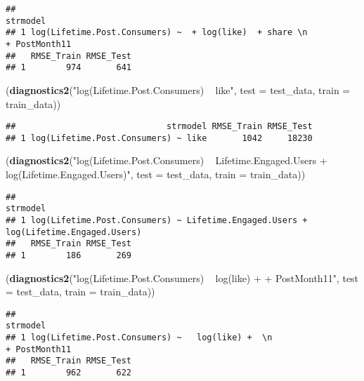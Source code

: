 \documentclass[
]{article}
\newenvironment{Shaded}{\begin{snugshade}}{\end{snugshade}}
\newcommand{\DataTypeTok}[1]{\textcolor[rgb]{0.13,0.29,0.53}{#1}}
\newcommand{\KeywordTok}[1]{\textcolor[rgb]{0.13,0.29,0.53}{\textbf{#1}}}
\newcommand{\NormalTok}[1]{#1}
\newcommand{\StringTok}[1]{\textcolor[rgb]{0.31,0.60,0.02}{#1}}
\begin{document}
\begin{verbatim}
##                                                                                strmodel
## 1 log(Lifetime.Post.Consumers) ~  + log(like)  + share \n                 + PostMonth11
##   RMSE_Train RMSE_Test
## 1        974       641
\end{verbatim}

\begin{Shaded}
\begin{Highlighting}[]
\NormalTok{(}\KeywordTok{diagnostics2}\NormalTok{(}\StringTok{"log(Lifetime.Post.Consumers) ~ like"}\NormalTok{, }\DataTypeTok{test =}\NormalTok{ test_data, }\DataTypeTok{train =}\NormalTok{ train_data))}
\end{Highlighting}
\end{Shaded}

\begin{verbatim}
##                              strmodel RMSE_Train RMSE_Test
## 1 log(Lifetime.Post.Consumers) ~ like       1042     18230
\end{verbatim}

\begin{Shaded}
\begin{Highlighting}[]
\NormalTok{(}\KeywordTok{diagnostics2}\NormalTok{(}\StringTok{"log(Lifetime.Post.Consumers) ~ Lifetime.Engaged.Users + log(Lifetime.Engaged.Users)"}\NormalTok{, }\DataTypeTok{test =}\NormalTok{ test_data, }\DataTypeTok{train =}\NormalTok{ train_data))}
\end{Highlighting}
\end{Shaded}

\begin{verbatim}
##                                                                              strmodel
## 1 log(Lifetime.Post.Consumers) ~ Lifetime.Engaged.Users + log(Lifetime.Engaged.Users)
##   RMSE_Train RMSE_Test
## 1        186       269
\end{verbatim}

\begin{Shaded}
\begin{Highlighting}[]
\NormalTok{(}\KeywordTok{diagnostics2}\NormalTok{(}\StringTok{"log(Lifetime.Post.Consumers) ~   log(like) +  }
\StringTok{                 + PostMonth11"}\NormalTok{, }\DataTypeTok{test =}\NormalTok{ test_data, }\DataTypeTok{train =}\NormalTok{ train_data))}
\end{Highlighting}
\end{Shaded}

\begin{verbatim}
##                                                                         strmodel
## 1 log(Lifetime.Post.Consumers) ~   log(like) +  \n                 + PostMonth11
##   RMSE_Train RMSE_Test
## 1        962       622
\end{verbatim}
\end{document}
